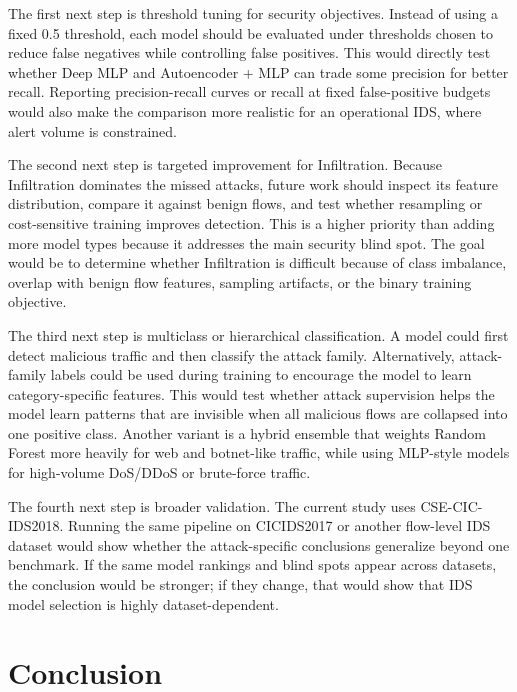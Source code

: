 \documentclass[sigconf,nonacm]{acmart}
\begin{document}
The first next step is threshold tuning for security objectives.
Instead of using a fixed 0.5 threshold, each model should be evaluated under thresholds chosen to reduce false negatives while controlling false positives.
This would directly test whether Deep MLP and Autoencoder + MLP can trade some precision for better recall.
Reporting precision-recall curves or recall at fixed false-positive budgets would also make the comparison more realistic for an operational IDS, where alert volume is constrained.

The second next step is targeted improvement for Infiltration.
Because Infiltration dominates the missed attacks, future work should inspect its feature distribution, compare it against benign flows, and test whether resampling or cost-sensitive training improves detection.
This is a higher priority than adding more model types because it addresses the main security blind spot.
The goal would be to determine whether Infiltration is difficult because of class imbalance, overlap with benign flow features, sampling artifacts, or the binary training objective.

The third next step is multiclass or hierarchical classification.
A model could first detect malicious traffic and then classify the attack family.
Alternatively, attack-family labels could be used during training to encourage the model to learn category-specific features.
This would test whether attack supervision helps the model learn patterns that are invisible when all malicious flows are collapsed into one positive class.
Another variant is a hybrid ensemble that weights Random Forest more heavily for web and botnet-like traffic, while using MLP-style models for high-volume DoS/DDoS or brute-force traffic.

The fourth next step is broader validation.
The current study uses CSE-CIC-IDS2018.
Running the same pipeline on CICIDS2017 or another flow-level IDS dataset would show whether the attack-specific conclusions generalize beyond one benchmark.
If the same model rankings and blind spots appear across datasets, the conclusion would be stronger; if they change, that would show that IDS model selection is highly dataset-dependent.

\section{Conclusion}
\end{document}

